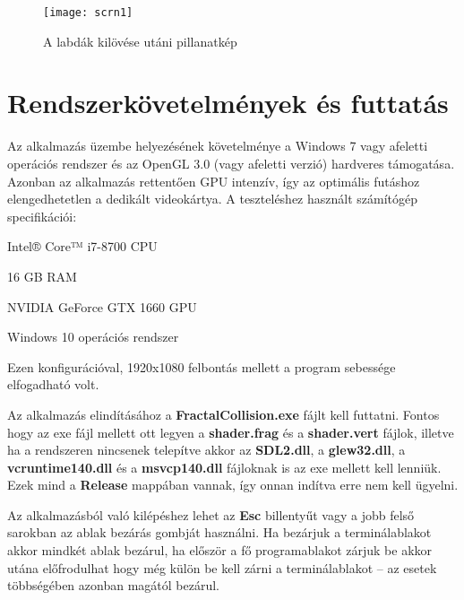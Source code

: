 \begin{figure}[H]
	\centering
	\texttt{[image: scrn1]}
	\caption{A labdák kilövése utáni pillanatkép}
	\label{fig:home}
\end{figure}
 
\cleardoublepage
\section{Rendszerkövetelmények és futtatás} 
\label{sec:futtatas} 
Az alkalmazás üzembe helyezésének követelménye a Windows 7 vagy afeletti operációs rendszer és az OpenGL 3.0 (vagy afeletti verzió) hardveres támogatása. Azonban az alkalmazás rettentően GPU intenzív, így az optimális futáshoz elengedhetetlen a dedikált videokártya. A teszteléshez használt számítógép specifikációi:
\begin{compactitem}
	\item Intel® Core™ i7-8700 CPU
	\item 16 GB RAM
	\item NVIDIA GeForce GTX 1660 GPU
	\item Windows 10 operációs rendszer
\end{compactitem}
Ezen konfigurációval, 1920x1080 felbontás mellett a program sebessége elfogadható volt.

Az alkalmazás elindításához a \textbf{FractalCollision.exe} fájlt kell futtatni. Fontos hogy az exe fájl mellett ott legyen a \textbf{shader.frag} és a \textbf{shader.vert} fájlok, illetve ha a rendszeren nincsenek telepítve akkor az \textbf{SDL2.dll}, a \textbf{glew32.dll}, a \textbf{vcruntime140.dll} és a \textbf{msvcp140.dll} fájloknak is az exe mellett kell lenniük. Ezek mind a \textbf{Release} mappában vannak, így onnan indítva erre nem kell ügyelni.

Az alkalmazásból való kilépéshez lehet az \textbf{Esc} billentyűt vagy a jobb felső sarokban az ablak bezárás gombját használni. Ha bezárjuk a terminálablakot akkor mindkét ablak bezárul, ha először a fő programablakot zárjuk be akkor utána előfrodulhat hogy még külön be kell zárni a terminálablakot -- az esetek többségében azonban magától bezárul.


